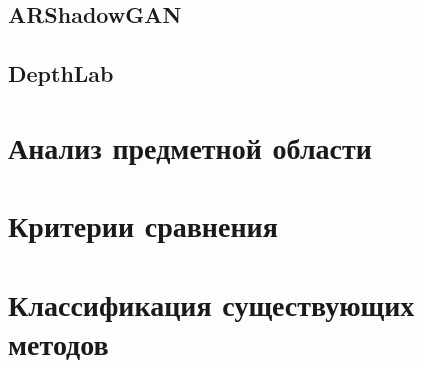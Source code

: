 \subsection{ARShadowGAN}



\subsection{DepthLab}



\section{Анализ предметной области}



\section{Критерии сравнения}



\section{Классификация существующих методов}